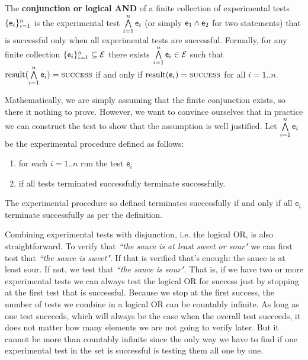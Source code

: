 \documentclass[11pt,letterpaper,fleqn]{memoir} %
\begin{document}
\begin{mathSection}
	\begin{defn}\label{def_experimental_test_AND}
	The \textbf{conjunction or logical AND} of a finite collection of experimental tests $\{\mathsf{e}_i\}_{i=1}^{n}$ is the experimental test $\bigwedge\limits_{i=1}^{n} \mathsf{e}_i$ (or simply $\mathsf{e}_1 \wedge \mathsf{e}_2$ for two statements) that is successful only when all experimental tests are successful. Formally, for any finite collection $\{\mathsf{e}_i\}_{i=1}^{n} \subseteq \mathcal{E}$ there exists $ \bigwedge\limits_{i=1}^{n} \mathsf{e}_i \in \mathcal{E}$ such that $\operatorname{result}(\bigwedge\limits_{i=1}^{n} \mathsf{e}_i) = \textsc{success}$ if and only if $\operatorname{result}(\mathsf{e}_i) = \textsc{success}$ for all $i=1..n$.
	\end{defn}
	\begin{justification}
		Mathematically, we are simply assuming that the finite conjunction exists, so there it nothing to prove. However, we want to convince ourselves that in practice we can construct the test to show that the assumption is well justified. Let $\bigwedge\limits_{i=1}^{n} \mathsf{e}_i$ be the experimental procedure defined as follows:
		\begin{enumerate}
			\item for each $i=1..n$ run the test $\mathsf{e}_i$
			\item if all tests terminated successfully terminate successfully.
		\end{enumerate}
		The experimental procedure so defined terminates successfully if and only if all $\mathsf{e}_i$ terminate successfully as per the definition.
	\end{justification}
\end{mathSection}	

Combining experimental tests with disjunction, i.e. the logical OR, is also straightforward. To verify that \emph{``the sauce is at least sweet or sour"} we can first test that \emph{``the sauce is sweet"}. If that is verified that's enough: the sauce is at least sour. If not, we test that \emph{``the sauce is sour"}. That is, if we have two or more experimental tests we can always test the logical OR for success just by stopping at the first test that is successful. Because we stop at the first success, the number of tests we combine in a logical OR can be countably infinite. As long as one test succeeds, which will always be the case when the overall test succeeds, it does not matter how many elements we are not going to verify later. But it cannot be more than countably infinite since the only way we have to find if one experimental test in the set is successful is testing them all one by one.
\end{document}
